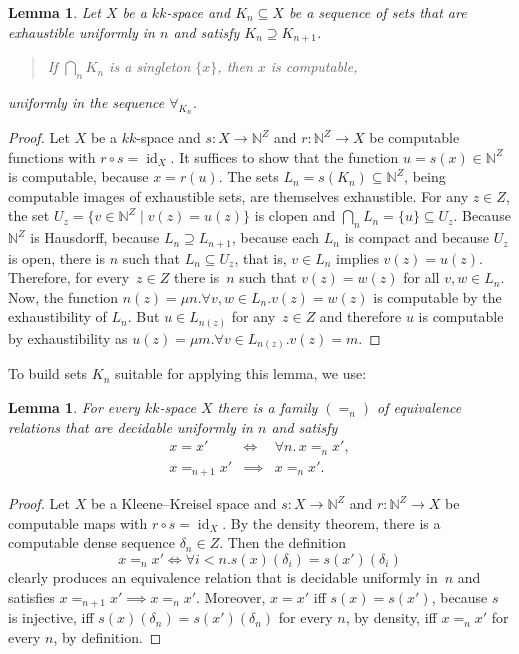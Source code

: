 \documentclass[10pt]{article}
\newcommand{\id}{\operatorname{id}}
\newtheorem{lemma}[cor]{Lemma}
\newcommand{\N}{\mathbb{N}}
\newcommand{\comp}{\circ}
\begin{document}
\pagebreak[3]
\begin{lemma} \label{unique} Let $X$ be a $kk$-space and $K_n
  \subseteq X$ be a sequence of sets that are exhaustible uniformly in
  $n$ and satisfy $K_n \supseteq K_{n+1}$.
  \begin{quote}
  If $\bigcap_n
    K_n$ is a singleton $\{x\}$, then $x$ is computable,
  \end{quote}
uniformly in the sequence $\forall_{K_n}$.
\end{lemma}
\begin{proof} 
  Let $X$ be a $kk$-space and $s \colon X \to \N^Z$ and $r \colon \N^Z
  \to X$ be computable functions with $r \comp s = \id_X$.  It
  suffices to show that the function $u=s(x) \in \N^Z$ is computable,
  because $x = r(u)$.  The sets $L_n = s(K_n) \subseteq \N^Z$, being
  computable images of exhaustible sets, are themselves exhaustible.
%
  For any $z \in Z$, the set $U_{z} = \{ v \in \N^Z \mid v(z) =
  u(z) \}$ is clopen and $\bigcap_n L_n = \{ u \} \subseteq U_{z}$.
  Because $\N^Z$ is Hausdorff, because $L_n \supseteq L_{n+1}$,
  because each $L_n$ is compact and because $U_{z}$ is open, there is
  $n$ such that $L_n \subseteq U_{z}$, that is, $v \in L_n$ implies
  $v(z) = u(z)$. Therefore, for every~$z \in Z$ there is~$n$ such that
  $v(z) = w(z)$ for all $v,w \in L_n$.
%
  Now, the function $n(z)=\mu n.\forall v,w \in L_n.  v(z)=w(z)$ is
  computable by the exhaustibility of $L_n$.  But $u \in L_{n(z)}$ for
  any~$z \in Z$ and therefore $u$ is computable by exhaustibility as
  $u(z)=\mu m.  \forall v \in L_{n(z)}.  v(z)=m$.
\end{proof}

To build sets $K_n$ suitable for applying this lemma, we use:
\begin{lemma} \label{equalupto} 
  For every $kk$-space $X$ there is a family $(=_n)$ of equivalence
  relations that are decidable uniformly in $n$ and satisfy
\begin{eqnarray*}
x=x' & \iff & \forall n.\,x =_n x', \\
x =_{n+1} x' & \implies & x =_n x'.
\end{eqnarray*}
\end{lemma}
\begin{proof}
  Let $X$ be a Kleene--Kreisel space and $s \colon X \to \N^Z$ and $r
  \colon \N^Z \to X$ be computable maps with $r \comp s = \id_X$. By
  the density theorem, there is a computable dense sequence $\delta_n
  \in Z$.  Then the definition
  \[
  x =_n x' \iff \forall i < n. s(x)(\delta_i) = s(x')(\delta_i)
  \]
  clearly produces an equivalence relation that is decidable uniformly
  in~$n$ and satisfies $x =_{n+1} x' \implies x =_n x'$. Moreover, $x
  = x'$ iff $s(x)=s(x')$, because $s$ is injective, iff
  $s(x)(\delta_n)=s(x')(\delta_n)$ for every $n$, by density, iff $x
  =_n x'$ for every $n$, by definition.
\end{proof}
\end{document}
